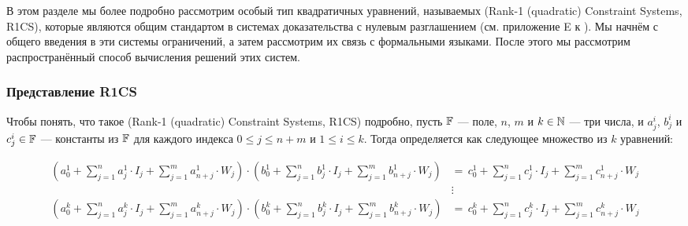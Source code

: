 В этом разделе мы более подробно рассмотрим особый тип квадратичных уравнений, называемых  (Rank-1 (quadratic) Constraint Systems, R1CS), которые являются общим стандартом в системах доказательства с нулевым разглашением (см. приложение E к \cite{sasson-2013}). Мы начнём с общего введения в эти системы ограничений, а затем рассмотрим их связь с формальными языками. После этого мы рассмотрим распространённый способ вычисления решений этих систем.

\subsubsection{Представление R1CS} Чтобы понять, что такое  (Rank-1 (quadratic) Constraint Systems, R1CS) подробно, пусть $\mathbb{F}$ — поле, $n$, $m$ и $k\in\mathbb{N}$ — три числа, и $a_j^i$, $b_j^i$ и $c_j^i\in\mathbb{F}$ — константы из $\mathbb{F}$ для каждого индекса $0\leq j \leq n+m$ и $1\leq i \leq k$. Тогда  определяется как следующее множество из $k$ уравнений: 

\begin{definition}\label{R1CS}
\begin{equation}\label{eq:R1CS}
\begin{split}
\scriptstyle\left(a^1_0 + \sum_{j=1}^n a^1_j \cdot I_j + \sum_{j=1}^m a^1_{n+j} \cdot W_j  \right) \cdot 
\left(b^1_0 + \sum_{j=1}^n b^1_j \cdot I_j + \sum_{j=1}^m b^1_{n+j} \cdot W_j  \right) &=\, 
\scriptstyle c^1_0 + \sum_{j=1}^n c^1_j \cdot I_j + \sum_{j=1}^m c^1_{n+j} \cdot W_j\\
       & \vdots\\
\scriptstyle\left(a^k_0 + \sum_{j=1}^n a^k_j \cdot I_j + \sum_{j=1}^m a^k_{n+j} \cdot W_j  \right) \cdot 
\left(b^k_0 + \sum_{j=1}^n b^k_j \cdot I_j + \sum_{j=1}^m b^k_{n+j} \cdot W_j  \right) &=\, 
\scriptstyle c^k_0 + \sum_{j=1}^n c^k_j \cdot I_j + \sum_{j=1}^m c^k_{n+j} \cdot W_j       
\end{split}
\end{equation}
\end{definition}

